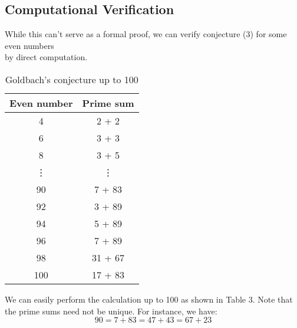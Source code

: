 \documentclass{article}
\begin{document}
\subsection*{Computational Verification}
While this can't serve as a formal proof, we can verify conjecture (3) for some even numbers \\
by direct computation.\hfill\mbox{}
\begin{wraptable}[13]{r}{7cm}
    \centering
    \begin{tabular}{|c|c|}
        \hline
        \textbf{Even number} & \textbf{Prime sum} \\ \hline
        4  & 2 + 2 \\ \hline
        6  & 3 + 3 \\ \hline
        8  & 3 + 5 \\ \hline
        \vdots & \vdots \\ \hline
        90 & 7 + 83 \\ \hline
        92 & 3 + 89 \\ \hline
        94 & 5 + 89 \\ \hline
        96 & 7 + 89 \\ \hline
        98 & 31 + 67 \\ \hline
        100 & 17 + 83 \\ \hline
    \end{tabular}
    \caption{Goldbach's conjecture up to 100}
\end{wraptable}

We can easily perform the calculation up to 100 as shown in Table 3. Note that the prime sums need not be unique. For instance, we have:
$$90 = 7 + 83 = 47 + 43 = 67 + 23$$
\end{document}
